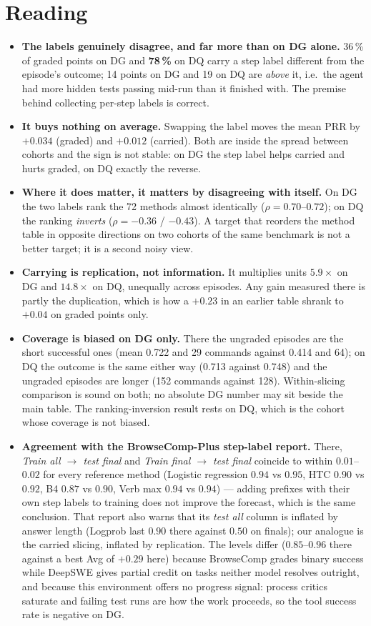 \documentclass[10pt,a4paper]{article}
\begin{document}
\section*{Reading}
\begin{itemize}\small
\item \textbf{The labels genuinely disagree, and far more than on DG alone.} 36\,\% of graded points on DG and \textbf{78\,\%} on DQ carry a step label different from the episode's outcome; 14 points on DG and 19 on DQ are \emph{above} it, i.e.\ the agent had more hidden tests passing mid-run than it finished with. The premise behind collecting per-step labels is correct.
\item \textbf{It buys nothing on average.} Swapping the label moves the mean PRR by $+0.034$ (graded) and $+0.012$ (carried). Both are inside the spread between cohorts and the sign is not stable: on DG the step label helps carried and hurts graded, on DQ exactly the reverse.
\item \textbf{Where it does matter, it matters by disagreeing with itself.} On DG the two labels rank the 72 methods almost identically ($\rho=0.70$--$0.72$); on DQ the ranking \emph{inverts} ($\rho=-0.36$ / $-0.43$). A target that reorders the method table in opposite directions on two cohorts of the same benchmark is not a better target; it is a second noisy view.
\item \textbf{Carrying is replication, not information.} It multiplies units $5.9\times$ on DG and $14.8\times$ on DQ, unequally across episodes. Any gain measured there is partly the duplication, which is how a $+0.23$ in an earlier table shrank to $+0.04$ on graded points only.
\item \textbf{Coverage is biased on DG only.} There the ungraded episodes are the short successful ones (mean 0.722 and 29 commands against 0.414 and 64); on DQ the outcome is the same either way (0.713 against 0.748) and the ungraded episodes are longer (152 commands against 128). Within-slicing comparison is sound on both; no absolute DG number may sit beside the main table. The ranking-inversion result rests on DQ, which is the cohort whose coverage is not biased.
\item \textbf{Agreement with the BrowseComp-Plus step-label report.} There, \emph{Train all \ensuremath{\to} test final} and \emph{Train final \ensuremath{\to} test final} coincide to within $0.01$--$0.02$ for every reference method (Logistic regression $0.94$ vs $0.95$, HTC $0.90$ vs $0.92$, B4 $0.87$ vs $0.90$, Verb max $0.94$ vs $0.94$) --- adding prefixes with their own step labels to training does not improve the forecast, which is the same conclusion. That report also warns that its \emph{test all} column is inflated by answer length (Logprob last $0.90$ there against $0.50$ on finals); our analogue is the carried slicing, inflated by replication. The levels differ ($0.85$--$0.96$ there against a best Avg of $+0.29$ here) because BrowseComp grades binary success while DeepSWE gives partial credit on tasks neither model resolves outright, and because this environment offers no progress signal: process critics saturate and failing test runs are how the work proceeds, so the tool success rate is negative on DG.
\end{itemize}
\end{document}
